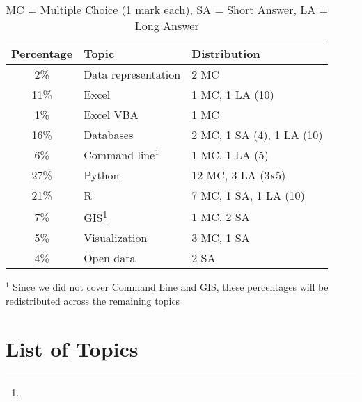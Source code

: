 \documentclass[12pt]{article}%
\begin{document}
\begin{table}[h]
\caption{\footnotesize MC = Multiple Choice (1 mark each), SA = Short Answer, LA = Long Answer}
\begin{center}
\begin{tabular}{|c | l| l |}
 \hline
{\bf Percentage}&  {\bf Topic} &  {\bf Distribution} \\
 \hline
   2\% &  Data representation &  2 MC\\
11\% & Excel &  1 MC, 1 LA (10)\\
 1\% & Excel VBA &  1 MC\\
16\% & Databases &  2 MC, 1 SA (4), 1 LA (10)\\
 6\% & Command line$^1$ &  1 MC, 1 LA (5)\\
27\% & Python & 12 MC, 3 LA (3x5)\\
21\% & R &  7 MC, 1 SA, 1 LA (10)\\
 7\% & GIS\footnote{} &  1 MC, 2 SA \\
 5\% & Visualization &  3 MC, 1 SA \\
 4\% & Open data &  2 SA \\
 \hline
\end{tabular}

{\small $^1$ Since we did not cover Command Line and GIS, these percentages will be redistributed across the remaining topics}
\end{center}
\label{default}
\end{table}%

%


\newpage


\section{List of Topics}
\end{document}
